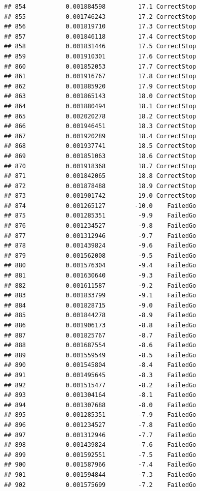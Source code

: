 \documentclass[
]{article}
\begin{document}
\begin{verbatim}
## 854           0.001884598         17.1 CorrectStop
## 855           0.001746243         17.2 CorrectStop
## 856           0.001819710         17.3 CorrectStop
## 857           0.001846118         17.4 CorrectStop
## 858           0.001831446         17.5 CorrectStop
## 859           0.001910301         17.6 CorrectStop
## 860           0.001852053         17.7 CorrectStop
## 861           0.001916767         17.8 CorrectStop
## 862           0.001885920         17.9 CorrectStop
## 863           0.001865143         18.0 CorrectStop
## 864           0.001880494         18.1 CorrectStop
## 865           0.002020278         18.2 CorrectStop
## 866           0.001946451         18.3 CorrectStop
## 867           0.001920289         18.4 CorrectStop
## 868           0.001937741         18.5 CorrectStop
## 869           0.001851063         18.6 CorrectStop
## 870           0.001918368         18.7 CorrectStop
## 871           0.001842065         18.8 CorrectStop
## 872           0.001878488         18.9 CorrectStop
## 873           0.001901742         19.0 CorrectStop
## 874           0.001265127        -10.0    FailedGo
## 875           0.001285351         -9.9    FailedGo
## 876           0.001234527         -9.8    FailedGo
## 877           0.001312946         -9.7    FailedGo
## 878           0.001439824         -9.6    FailedGo
## 879           0.001562008         -9.5    FailedGo
## 880           0.001576304         -9.4    FailedGo
## 881           0.001630640         -9.3    FailedGo
## 882           0.001611587         -9.2    FailedGo
## 883           0.001833799         -9.1    FailedGo
## 884           0.001828715         -9.0    FailedGo
## 885           0.001844278         -8.9    FailedGo
## 886           0.001906173         -8.8    FailedGo
## 887           0.001825767         -8.7    FailedGo
## 888           0.001687554         -8.6    FailedGo
## 889           0.001559549         -8.5    FailedGo
## 890           0.001545804         -8.4    FailedGo
## 891           0.001495645         -8.3    FailedGo
## 892           0.001515477         -8.2    FailedGo
## 893           0.001304164         -8.1    FailedGo
## 894           0.001307688         -8.0    FailedGo
## 895           0.001285351         -7.9    FailedGo
## 896           0.001234527         -7.8    FailedGo
## 897           0.001312946         -7.7    FailedGo
## 898           0.001439824         -7.6    FailedGo
## 899           0.001592551         -7.5    FailedGo
## 900           0.001587966         -7.4    FailedGo
## 901           0.001594844         -7.3    FailedGo
## 902           0.001575699         -7.2    FailedGo

\end{verbatim}
\end{document}
